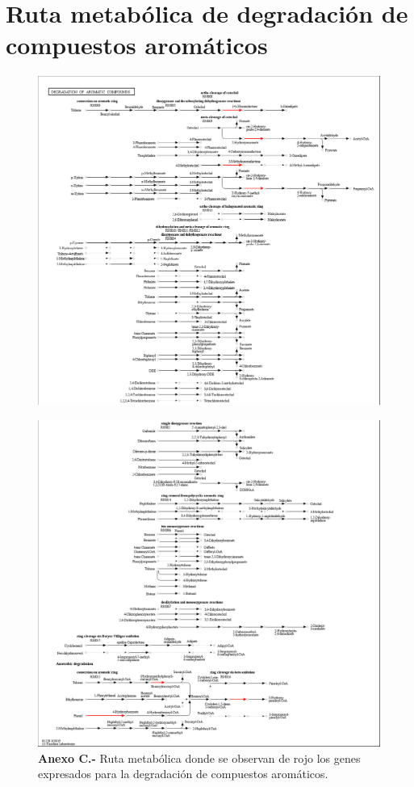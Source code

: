 \documentclass[12pt,letterpaper,oneside]{report}
\begin{document}
\chapter{Ruta metabólica de degradación de compuestos aromáticos}
\begin{figure}[!h]
\centerline{\includegraphics[width=\linewidth,height=\textheight,keepaspectratio]{apendices/C-3 A}}
\end{figure}
\begin{figure}
\includegraphics[width=\linewidth,height=\textheight,keepaspectratio]{apendices/C-3 B}
\caption*{\textbf{Anexo C.-} Ruta metabólica donde se observan de rojo los genes expresados para la degradación de compuestos aromáticos.}
\end{figure}
\end{document}
